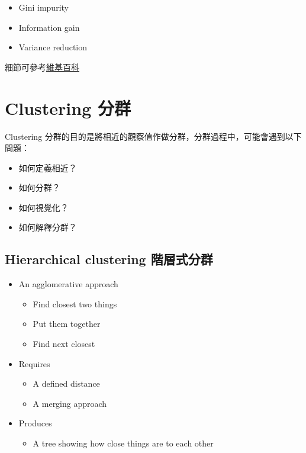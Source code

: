 \documentclass[
]{book}
\providecommand{\tightlist}{%
  \setlength{\itemsep}{0pt}\setlength{\parskip}{0pt}}
\begin{document}
\begin{itemize}
\tightlist
\item
  Gini impurity
\item
  Information gain
\item
  Variance reduction
\end{itemize}

細節可參考\href{https://en.wikipedia.org/wiki/Decision_tree_learning}{維基百科}

\hypertarget{clustering-ux5206ux7fa4}{%
\section{Clustering 分群}\label{clustering-ux5206ux7fa4}}

Clustering 分群的目的是將相近的觀察值作做分群，分群過程中，可能會遇到以下問題：

\begin{itemize}
\tightlist
\item
  如何定義相近？
\item
  如何分群？
\item
  如何視覺化？
\item
  如何解釋分群？
\end{itemize}

\hypertarget{hierarchical-clustering-ux968eux5c64ux5f0fux5206ux7fa4}{%
\subsection{Hierarchical clustering 階層式分群}\label{hierarchical-clustering-ux968eux5c64ux5f0fux5206ux7fa4}}

\begin{itemize}
\tightlist
\item
  An agglomerative approach

  \begin{itemize}
  \tightlist
  \item
    Find closest two things
  \item
    Put them together
  \item
    Find next closest
  \end{itemize}
\item
  Requires

  \begin{itemize}
  \tightlist
  \item
    A defined distance
  \item
    A merging approach
  \end{itemize}
\item
  Produces

  \begin{itemize}
  \tightlist
  \item
    A tree showing how close things are to each other
  \end{itemize}
\end{itemize}
\end{document}
